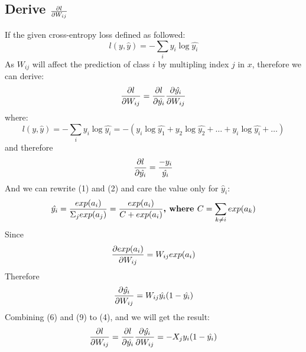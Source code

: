 \documentclass{article}
\begin{document}
\subsection{Derive ${\partial l\over \partial W_{ij}}$}
If the given cross-entropy loss defined as followed:
\begin{equation}
l(y, \hat{y}) = -\sum_i y_i\log\hat{y_i}
\end{equation}
As $W_{ij}$ will affect the prediction of class $i$ by multipling index $j$ in $x$, therefore we can derive:
\begin{equation}
{\partial l\over \partial W_{ij}} = {\partial l \over \partial \hat{y_i}} {\partial \hat{y_i} \over \partial W_{ij}}
\end{equation}
where:
\begin{equation}
l(y, \hat{y}) = -\sum_i y_i\log\hat{y_i} = -(y_i\log\hat{y_1} + y_2\log\hat{y_2} + \dots + y_i\log\hat{y_i} + \dots)
\end{equation}
and therefore
\begin{equation}
{\partial l \over \partial \hat{y_i}} = {-y_i\over \hat{y_i}}
\end{equation}
And we can rewrite (1) and (2) and care the value only for $\hat y_i$:
\begin{equation}
\hat{y_i} = {exp(a_i) \over \Sigma_j exp(a_j)} = {exp(a_i) \over C + exp(a_i)} \textbf{,  where $C = \sum_{k\neq i} exp(a_k)$}
\end{equation}
Since
\begin{equation}
{\partial exp(a_i) \over \partial W_{ij}} = W_{ij}exp(a_i)
\end{equation}
Therefore
\begin{equation}
{\partial \hat{y_i} \over \partial W_{ij}} = W_{ij}\hat{y_i}(1-\hat{y_i})
\end{equation}
Combining (6) and (9) to (4), and we will get the result:
\begin{equation}
{\partial l\over \partial W_{ij}} = {\partial l \over \partial \hat{y_i}} {\partial \hat{y_i} \over \partial W_{ij}} = -X_jy_i(1- \hat{y_i})
\end{equation}
\end{document}
